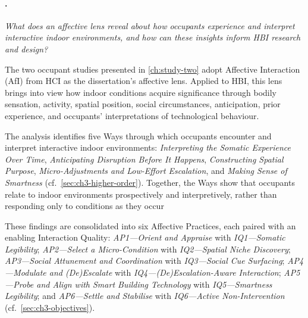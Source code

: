 \clearpage  


\paragraph{.}

\emph{What does an affective lens reveal about how occupants experience
and interpret interactive indoor environments, and how can these
insights inform HBI research and design?}


The two occupant studies presented in \autoref{ch:study-two} adopt
Affective Interaction (AfI) from HCI as the dissertation's affective
lens.  Applied to HBI, this lens brings into view how indoor conditions acquire significance through bodily sensation, activity, spatial position, social circumstances, anticipation, prior experience, and occupants' interpretations of technological behaviour.

The analysis identifies five Ways through which occupants encounter and interpret interactive indoor environments: \textit{Interpreting the Somatic Experience Over Time}, \textit{Anticipating Disruption Before It Happens}, \textit{Constructing Spatial Purpose}, \textit{Micro-Adjustments and Low-Effort Escalation}, and \textit{Making Sense of Smartness} (cf.~\autoref{sec:ch3-higher-order}). Together, the Ways show that occupants relate to indoor environments prospectively and interpretively, rather than responding only to conditions as they occur

These findings are consolidated into six Affective Practices, each paired with an enabling Interaction Quality:
\textit{AP1---Orient and Appraise} with
\textit{IQ1---Somatic Legibility};
\textit{AP2---Select a Micro-Condition} with
\textit{IQ2---Spatial Niche Discovery};
\textit{AP3---Social Attunement and Coordination} with
\textit{IQ3---Social Cue Surfacing};
\textit{AP4---Modulate and (De)Escalate} with
\textit{IQ4---(De)Escalation-Aware Interaction};
\textit{AP5---Probe and Align with Smart Building Technology} with
\textit{IQ5---Smartness Legibility}; and
\textit{AP6---Settle and Stabilise} with
\textit{IQ6---Active Non-Intervention} (cf.~\autoref{sec:ch3-objectives}). 

